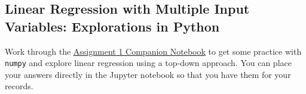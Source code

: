 \documentclass[assignment01_Solutions]{subfiles}
\begin{document}
\subsection{Linear Regression with Multiple Input Variables: Explorations in Python}
\begin{externalresources}[(90 minutes)]
Work through the \href{https://colab.research.google.com/drive/12pLbQkhrPoI-22FVV6gZNObi1IJCW-mF}{Assignment 1 Companion Notebook} to get some practice with {\tt numpy} and explore linear regression using a top-down approach.  You can place your answers directly in the Jupyter notebook so that you have them for your records.
\end{externalresources}

\end{document}
